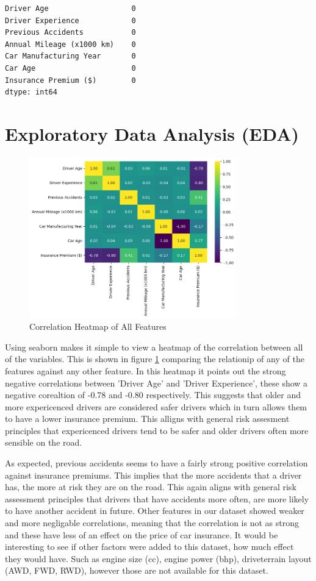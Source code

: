 \documentclass{article}
\begin{document}
\begin{verbatim}
Driver Age                   0
Driver Experience            0
Previous Accidents           0
Annual Mileage (x1000 km)    0
Car Manufacturing Year       0
Car Age                      0
Insurance Premium ($)        0
dtype: int64
\end{verbatim}





\newpage
\section{Exploratory Data Analysis (EDA)}

\begin{figure}[h]
\centering
\includegraphics[width=0.8\textwidth]{heatmap.png}
\caption{Correlation Heatmap of All Features}\label{fig:heatmap}
\end{figure}

Using seaborn makes it simple to view a heatmap of the correlation between all of the variables. This is shown in figure \ref{fig:heatmap} comparing the relationip of any of the features against any other feature. In this heatmap it points out the strong negative correlations between 'Driver Age' and 'Driver Experience', these show a negative corealtion of -0.78 and -0.80 respectively. This suggests that older and more expericenced drivers are considered safer drivers which in turn allows them to have a lower insurance premium. This alligns with general risk assesment principles that expericenced drivers tend to be safer and older drivers often more sensible on the road. 

As expected, previous accidents seems to have a fairly strong positive correlation against insurance premiums. This implies that the more accidents that a driver has, the more at risk they are on the road. This again aligns with general risk assessment principles that drivers that have accidents more often, are more likely to have another accident in future. Other features in our dataset showed weaker and more negligable correlations, meaning that the correlation is not as strong and these have less of an effect on the price of car insurance. It would be interesting to see if other factors were added to this dataset, how much effect they would have. Such as engine size (cc), engine power (bhp), driveterrain layout (AWD, FWD, RWD), however those are not available for this dataset.
\end{document}
